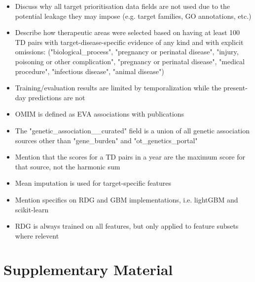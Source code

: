 \documentclass{article}
\begin{document}
\begin{itemize}
  \item Discuss why all target prioritisation data fields are not used due to the potential leakage they may impose (e.g. target families, GO annotations, etc.)
  \item Describe how therapeutic areas were selected based on having at least 100 TD pairs with target-disease-specific evidence of any kind and with explicit omissions: ("biological\_process", "pregnancy or perinatal disease", "injury, poisoning or other complication", "pregnancy or perinatal disease", "medical procedure", "infectious disease", "animal disease")
  \item Training/evaluation results are limited by temporalization while the present-day predictions are not
  \item OMIM is defined as EVA associations with publications
  \item The "genetic\_association\_\_curated" field is a union of all genetic association sources other than "gene\_burden" and "ot\_genetics\_portal"
  \item Mention that the scores for a TD pairs in a year are the maximum score for that source, not the harmonic sum
  \item Mean imputation is used for target-specific features
  \item Mention specifics on RDG and GBM implementations, i.e. lightGBM and scikit-learn
  \item RDG is always trained on all features, but only applied to feature subsets where relevent
\end{itemize} 

\section{Supplementary Material}






\end{document}
